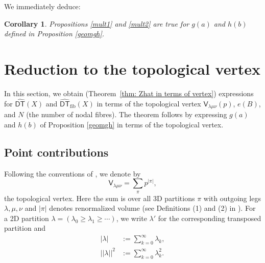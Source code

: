 \documentclass{amsart}
\newtheorem{corollary}[theorem]{Corollary}
\theoremstyle{definition}
\newcommand{\sfV}{\mathsf{V}}
\newcommand{\DT}{\mathsf{DT}}
\newcommand{\DThat}{\widehat{\DT}}
\newcommand{\fiber}{\mathrm{fib}}
\begin{document}
We immediately deduce:  
\begin{corollary} 
Propositions \ref{mult1} and \ref{mult2} are true for $g(a)$ and $h(b)$ defined in Proposition \ref{geomgh}.
\end{corollary}   
   
   
\section{Reduction to the topological vertex}  \label{vertex} 

In this section, we obtain (Theorem~\ref{thm: Zhat in terms of
vertex}) expressions for $\DThat (X)$ and $\DThat_{\fiber }(X)$ in
terms of the topological vertex $\sfV_{\lambda\mu\nu}(p)$, $e(B)$, and
$N$ (the number of nodal fibres). The theorem follows by expressing
$g(a)$ and $h(b)$ of Proposition \ref{geomgh} in terms of the
topological vertex.


\subsection{Point contributions}   

Following the conventions of \cite{BKY}, we denote by 
$$
\sfV_{\lambda\mu\nu} = \sum_{\pi} p^{|\pi|}, 
$$
the topological vertex. Here the sum is over all 3D partitions $\pi$
with outgoing legs $\lambda, \mu, \nu$ and $|\pi|$ denotes
renormalized volume (see Definitions (1) and (2) in \cite{BKY}). For a
2D partition $\lambda = (\lambda_0 \geq \lambda_1 \geq \cdots)$, we
write $\lambda'$ for the corresponding transposed partition and
\begin{align*}
|\lambda| &:= \sum_{k=0}^{\infty} \lambda_k, \\
|\!|\lambda|\!|^2 &:= \sum_{k=0}^{\infty} \lambda_{k}^{2}.
\end{align*}
\end{document}
